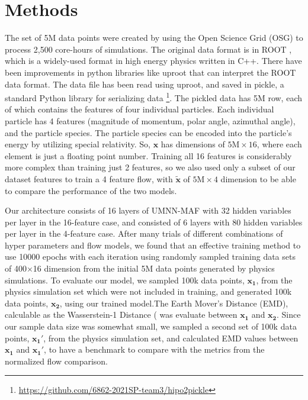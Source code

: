\section{Methods}
The set of 5M data points were created by using the Open Science Grid (OSG) to process 2,500 core-hours of simulations. The original data format is in ROOT \cite{root}, which is a widely-used format in high energy physics written in C++. There have been improvements in python libraries like uproot \cite{uproot} that can interpret the ROOT data format. The data file has been read using uproot, and saved in pickle, a standard Python library for serializing data \footnote{\url{https://github.com/6862-2021SP-team3/hipo2pickle}}. The pickled data has 5M row, each of which contains the features of four individual particles. Each individual particle has 4 features (magnitude of momentum, polar angle, azimuthal angle), and the particle species. The particle species can be encoded into the particle's energy by utilizing special relativity. So, $\mathbf{x}$ has dimensions of $5\text{M}\times16$, where each element is just a floating point number. Training all 16 features is considerably more complex than training just 2 features, so we also used only a subset of our dataset features to train a 4 feature flow, with $\mathbf{\tilde{x}}$ of $5\text{M}\times4$ dimension to be able to compare the performance of the two models. %


Our architecture consists of 16 layers of UMNN-MAF with 32 hidden variables per layer in the 16-feature case, and consisted of 6 layers with 80 hidden variables per layer in the 4-feature case. After many trials of different combinations of hyper parameters and flow models, we found that an effective training method to use 10000 epochs with each iteration using randomly sampled training data sets of 400$\times$16 dimension from the initial 5M data points generated by physics simulations. To evaluate our model, we sampled 100k data points, $\mathbf{x_1}$, from the physics simulation set which were not included in training, and generated 100k data points, $\mathbf{x_2}$, using our trained model.The Earth Mover's Distance (EMD), calculable as the Wasserstein-1 Distance (\citet{Dobrushin} was evaluate between $\mathbf{x_1}$ and $\mathbf{x_2}$. Since our sample data size was somewhat small, we sampled a second set of 100k data points, $\mathbf{x_1'}$, from the physics simulation set, and calculated EMD values between  $\mathbf{x_1}$ and $\mathbf{x_1'}$, to have a benchmark to compare with the metrics from the normalized flow comparison.


